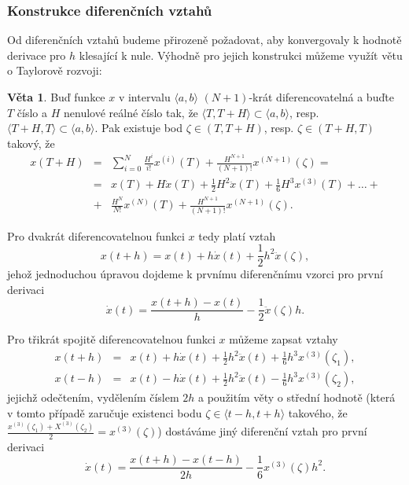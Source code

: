 \documentclass[a4paper, 12pt]{book}
\theoremstyle{definition}
\newtheorem{theorem}{Věta}[section]
\begin{document}
\subsubsection{Konstrukce diferenčních vztahů}
Od diferenčních vztahů budeme přirozeně požadovat, aby konvergovaly k hodnotě derivace
pro $h$ klesající k nule. Výhodně pro jejich konstrukci můžeme využít větu o Taylorově 
rozvoji:
\begin{theorem}\label{TaylorV}
Buď funkce $x$ v intervalu $\langle a,b\rangle$ $(N+1)$-krát diferencovatelná a buďte $T$ 
číslo a $H$ nenulové reálné číslo tak, že $\langle T,T+H\rangle\subset\langle a,b\rangle$, 
resp. $\langle T+H,T\rangle\subset\langle a,b\rangle$. Pak existuje bod $\zeta\in(T,T+H)$, 
resp. $\zeta\in(T+H,T)$ takový, že
\begin{equation}\label{taylorV}
\begin{array}{rcl}
x(T+H)&=&\sum_{i=0}^{N} \frac{H^i}{i!} x^{(i)}(T)+\frac{H^{N+1}}{(N+1)!}x^{(N+1)}(\zeta)=\\
&=&x(T)+H\dot x(T)+\frac 12H^2\ddot x(T)+\frac 16H^3 x^{(3)}(T)+\dots+\\
&+&\frac{H^N}{N!}x^{(N)}(T)+\frac{H^{N+1}}{(N+1)!}x^{(N+1)}(\zeta).
\end{array}
\end{equation}
\end{theorem}

Pro dvakrát diferencovatelnou funkci $x$ tedy platí vztah
\begin{displaymath}
x(t+h)=x(t)+h\dot x(t)+\frac 12h^2\ddot x(\zeta),
\end{displaymath}
jehož jednoduchou úpravou dojdeme k prvnímu diferenčnímu vzorci 
pro první derivaci
\begin{equation}\label{DV1a}
\dot x(t)=\frac{x(t+h)-x(t)}h - \frac 12\ddot x(\zeta)h.
\end{equation}

Pro třikrát spojitě diferencovatelnou funkci $x$ můžeme zapsat 
vztahy
\begin{eqnarray*}
x(t+h)&=&x(t)+h\dot x(t)+\frac 12h^2\ddot x(t)+\frac 16h^3 x^{(3)}(\zeta_1),\\
x(t-h)&=&x(t)-h\dot x(t)+\frac 12h^2\ddot x(t)-\frac 16h^3 x^{(3)}(\zeta_2),
\end{eqnarray*}
jejichž odečtením, vydělením číslem $2h$ a použitím věty o střední hodnotě 
(která v tomto případě zaručuje existenci bodu $\zeta\in\langle t-h, t+h\rangle$
takového, že $\frac{x^{(3)}(\zeta_1)+X^{(3)}(\zeta_2)}2=x^{(3)}(\zeta)$) dostáváme jiný 
diferenční vztah pro první derivaci
\begin{equation}\label{DV1s}
\dot x(t)=\frac{x(t+h)-x(t-h)}{2h} - \frac 16x^{(3)}(\zeta)h^2.
\end{equation}
\end{document}
